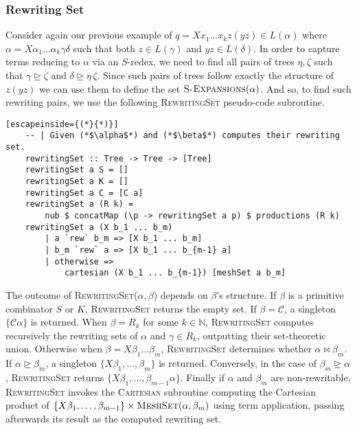 \documentclass[11pt,a4paper]{amsart}
\theoremstyle{definition}
\newcommand{\SExpansions}[1]{\textsc{S-Expansions}(#1)}
\begin{document}
\subsubsection{Rewriting Set}
Consider again our previous example of $q = X x_1 \ldots x_k z (y z) \in L(\alpha)$ where $\alpha = X \alpha_1 \ldots \alpha_k \gamma \delta$ such that both $z \in L(\gamma)$ and $yz \in L(\delta)$. In order to capture terms reducing to $\alpha$ via an $S$-redex, we need to find all pairs of trees $\eta,\zeta$ such that $\gamma \trianglerighteq \zeta$ and $\delta \trianglerighteq \eta\, \zeta$. Since such pairs of trees follow exactly the structure of $z (y z)$ we can use them to define the set $\SExpansions{\alpha}$. And so, to find such rewriting pairs, we use the following \textsc{RewritingSet} pseudo-code subroutine.

\begin{lstlisting}[escapeinside={(*}{*)}]
    -- | Given (*$\alpha$*) and (*$\beta$*) computes their rewriting set. 
    rewritingSet :: Tree -> Tree -> [Tree]
    rewritingSet a S = []
    rewritingSet a K = []
    rewritingSet a C = [C a]
    rewritingSet a (R k) = 
    	nub $ concatMap (\p -> rewritingSet a p) $ productions (R k)
    rewritingSet a (X b_1 ... b_m)
    	| a `rew` b_m => [X b_1 ... b_m]
    	| b_m `rew` a => [X b_1 ... b_{m-1} a]
    	| otherwise => 
    		cartesian (X b_1 ... b_{m-1}) [meshSet a b_m] 
\end{lstlisting}

The outcome of \textsc{RewritingSet}($\alpha,\beta$) depends on $\beta$'s structure. If $\beta$ is a primitive combinator $S$ or $K$, \textsc{RewritingSet} returns the empty set. If $\beta = \mathcal{C}$, a singleton $\{\mathcal{C} \alpha\}$ is returned. When $\beta = R_k$ for some $k\in \mathbb{N}$, \textsc{RewritingSet} computes recursively the rewriting sets of $\alpha$ and $\gamma \in R_k$, outputting their set-theoretic union. Otherwise when $\beta = X \beta_1 \ldots \beta_m$, \textsc{RewritingSet} determines whether $\alpha \bowtie \beta_m$. If $\alpha \trianglerighteq \beta_m$, a singleton $\{X \beta_1, \ldots, \beta_m\}$ is returned. Conversely, in the case of $\beta_m \trianglerighteq \alpha$, \textsc{RewritingSet} returns $\{X \beta_1, \ldots, \beta_{m-1} \alpha\}$. Finally if $\alpha$ and $\beta_m$ are non-rewritable, \textsc{RewritingSet} invokes the \textsc{Cartesian} subroutine computing the Cartesian product of $\{X \beta_1, \ldots, \beta_{m-1}\} \times \textsc{MeshSet}(\alpha,\beta_m)$ using term application, passing afterwards its result as the computed rewriting set.
\end{document}
